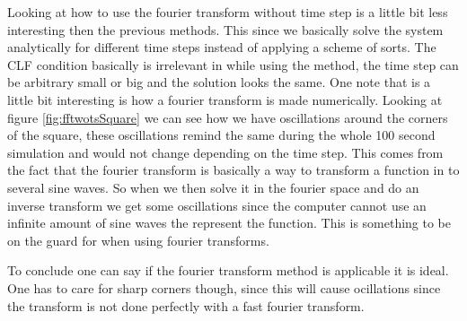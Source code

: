 \documentclass[11pt]{article}
\begin{document}
Looking at how to use the fourier transform without time step is a little bit less interesting then the previous methods. This since we basically solve the system analytically for different time steps instead of applying a scheme of sorts. The CLF condition basically is irrelevant in while using the method, the time step can be arbitrary small or big and the solution looks the same. One note that is a little bit interesting is how a fourier transform is made numerically. Looking at figure \ref{fig:fftwotsSquare} we can see how we have oscillations around the corners of the square, these oscillations remind the same during the whole 100 second simulation and would not change depending on the time step. This comes from the fact that the fourier transform is basically a way to transform a function in to several sine waves. So when we then solve it in the fourier space and do an inverse transform we get some oscillations since the computer cannot use an infinite amount of sine waves the represent the function. This is something to be on the guard for when using fourier transforms. 

To conclude one can say if the fourier transform method is applicable it is ideal. One has to care for sharp corners though, since this will cause ocillations since the transform is not done perfectly with a fast fourier transform. 
\end{document}
